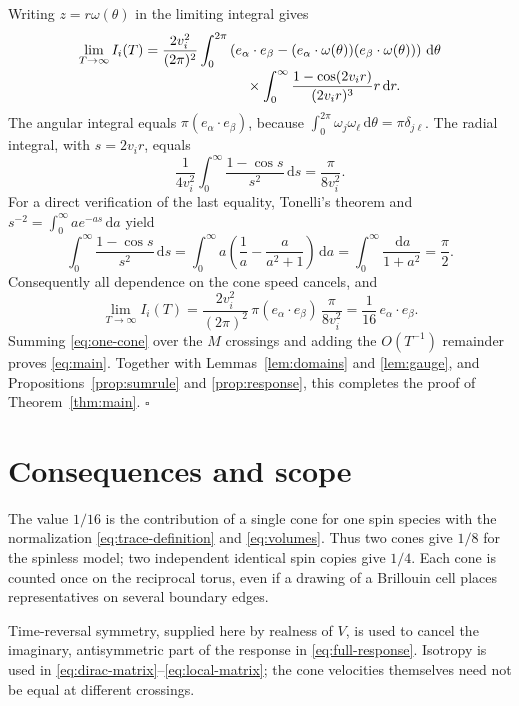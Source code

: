 \documentclass[11pt,a4paper]{article}
\numberwithin{equation}{section}
\newcommand{\dd}{\,\mathrm d}
\theoremstyle{remark}
\begin{document}
Writing $z=r\omega(\theta)$ in the limiting integral gives
\begin{align}
 \lim_{T\to\infty}I_i(T)
  =\frac{2v_i^2}{(2\pi)^2}
   &\int_0^{2\pi}\left(e_\alpha\cdot e_\beta
       -(e_\alpha\cdot\omega(\theta))
        (e_\beta\cdot\omega(\theta))\right)\dd\theta
       \notag\\[-2pt]
   &\hspace{12mm}\times
     \int_0^\infty\frac{1-\cos(2v_i r)}{(2v_i r)^3}
                          r\dd r.\label{eq:limiting-integrals}
\end{align}
The angular integral equals $\pi(e_\alpha\cdot e_\beta)$, because
$\int_0^{2\pi}\omega_j\omega_\ell\dd\theta=\pi\delta_{j\ell}$.
The radial integral, with $s=2v_i r$, equals
\[
 \frac1{4v_i^2}\int_0^\infty\frac{1-\cos s}{s^2}\dd s
       =\frac{\pi}{8v_i^2}.
\]
For a direct verification of the last equality, Tonelli's theorem and
$s^{-2}=\int_0^\infty a e^{-as}\dd a$ yield
\[
 \int_0^\infty\frac{1-\cos s}{s^2}\dd s
  =\int_0^\infty a\left(\frac1a-\frac{a}{a^2+1}\right)\dd a
  =\int_0^\infty\frac{\dd a}{1+a^2}=\frac\pi2.
\]
Consequently all dependence on the cone speed cancels, and
\begin{equation}\label{eq:one-cone}
 \lim_{T\to\infty}I_i(T)
    =\frac{2v_i^2}{(2\pi)^2}\,
        \pi(e_\alpha\cdot e_\beta)\,
        \frac{\pi}{8v_i^2}
    =\frac1{16}\,e_\alpha\cdot e_\beta.
\end{equation}
Summing \eqref{eq:one-cone} over the $M$ crossings and adding the
$O(T^{-1})$ remainder proves \eqref{eq:main}. Together with
Lemmas~\ref{lem:domains} and \ref{lem:gauge}, and
Propositions~\ref{prop:sumrule} and \ref{prop:response}, this completes
the proof of Theorem~\ref{thm:main}. \hfill$\square$

\section{Consequences and scope}

The value $1/16$ is the contribution of a single cone for one spin
species with the normalization \eqref{eq:trace-definition} and
\eqref{eq:volumes}. Thus two cones give $1/8$ for the spinless model;
two independent identical spin copies give $1/4$. Each cone is counted
once on the reciprocal torus, even if a drawing of a Brillouin cell
places representatives on several boundary edges.

Time-reversal symmetry, supplied here by realness of $V$, is used to
cancel the imaginary, antisymmetric part of the response in
\eqref{eq:full-response}. Isotropy is used in
\eqref{eq:dirac-matrix}--\eqref{eq:local-matrix}; the cone velocities
themselves need not be equal at different crossings.
\end{document}
